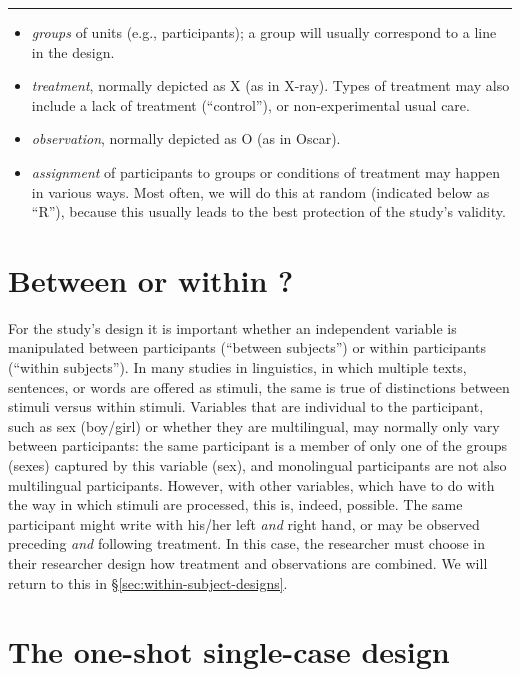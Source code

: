 \documentclass[
]{book}
\begin{document}
\begin{center}\rule{0.5\linewidth}{0.5pt}\end{center}

\begin{itemize}
\item
  \emph{groups} of units (e.g., participants); a group will usually correspond to a line in the design.
\item
  \emph{treatment}, normally depicted as X (as in X-ray). Types of treatment may also include a lack of treatment (``control''), or non-experimental usual care.
\item
  \emph{observation}, normally depicted as O (as in Oscar).
\item
  \emph{assignment} of participants to groups or conditions of treatment may happen in various ways. Most often, we will do this at random (indicated below as ``R''), because this usually leads to the best protection of the study's validity.
\end{itemize}

\hypertarget{sec:betweenwithinparticipants}{%
\section{Between or within ?}\label{sec:betweenwithinparticipants}}

For the study's design it is important whether an independent variable is manipulated between participants (``between subjects'') or within participants (``within subjects''). In many studies in linguistics, in which multiple texts, sentences, or words are offered as stimuli, the same is true of distinctions between stimuli versus within stimuli. Variables that are individual to the participant, such as sex (boy/girl) or whether they are multilingual, may normally only vary between participants: the same participant is a member of only one of the groups (sexes) captured by this variable (sex), and monolingual participants are not also multilingual participants. However, with other variables, which have to do with the way in which stimuli are processed, this is, indeed, possible. The same participant might write with his/her left \emph{and} right hand, or may be observed preceding \emph{and} following treatment. In this case, the researcher must choose in their researcher design how treatment and observations are combined. We will return to this in §\ref{sec:within-subject-designs}.

\hypertarget{sec:one-shot-single-case-design}{%
\section{The one-shot single-case design}\label{sec:one-shot-single-case-design}}
\end{document}
